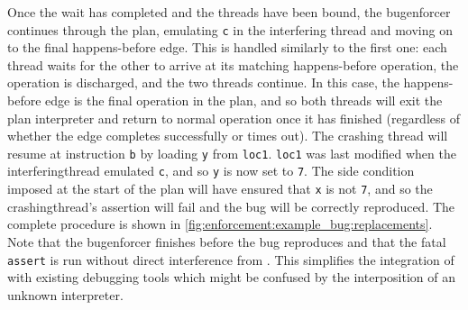 Once the wait has completed and the threads have been bound, the
\gls{bugenforcer} continues through the plan, emulating \texttt{c} in
the interfering thread and moving on to the final happens-before edge.
This is handled similarly to the first one: each thread waits for the
other to arrive at its matching happens-before operation, the
operation is discharged, and the two threads continue.  In this case,
the happens-before edge is the final operation in the plan, and so
both threads will exit the \gls{plan interpreter} and return to normal
operation once it has finished (regardless of whether the edge
completes successfully or times out).  The crashing thread will resume
at instruction {\tt b} by loading \texttt{y} from \texttt{loc1}.
\texttt{loc1} was last modified when the \gls{interferingthread}
emulated \texttt{c}, and so \texttt{y} is now set to \texttt{7}.  The
\gls{side condition} imposed at the start of the plan will have
ensured that \texttt{x} is not \texttt{7}, and so the
\gls{crashingthread}'s assertion will fail and the bug will be
correctly reproduced. The complete procedure is shown in
\autoref{fig:enforcement:example_bug:replacements}.  Note that the
\protect\gls{bugenforcer} finishes before the bug reproduces and that
the fatal \texttt{assert} is run without direct interference from
{\technique}.  This simplifies the integration of {\technique} with
existing debugging tools which might be confused by the interposition
of an unknown interpreter.

